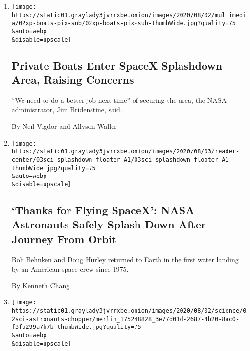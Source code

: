 \begin{enumerate}
\def\labelenumi{\arabic{enumi}.}
\item
  \href{/2020/08/02/us/flag-boat-SpaceX.html}{}

  \texttt{[image: https://static01.graylady3jvrrxbe.onion/images/2020/08/02/multimedia/02xp-boats-pix-sub/02xp-boats-pix-sub-thumbWide.jpg?quality=75\\\&auto=webp\\\&disable=upscale]}

  \hypertarget{private-boats-enter-spacex-splashdown-area-raising-concerns}{%
  \subsection{Private Boats Enter SpaceX Splashdown Area, Raising
  Concerns}\label{private-boats-enter-spacex-splashdown-area-raising-concerns}}

  ``We need to do a better job next time'' of securing the area, the
  NASA administrator, Jim Bridenstine, said.

  By Neil Vigdor and Allyson Waller
\item
  \href{/2020/08/02/science/spacex-astronauts-splashdown.html}{}

  \texttt{[image: https://static01.graylady3jvrrxbe.onion/images/2020/08/03/reader-center/03sci-splashdown-floater-A1/03sci-splashdown-floater-A1-thumbWide.jpg?quality=75\\\&auto=webp\\\&disable=upscale]}

  \hypertarget{thanks-for-flying-spacex-nasa-astronauts-safely-splash-down-after-journey-from-orbit}{%
  \subsection{`Thanks for Flying SpaceX': NASA Astronauts Safely Splash
  Down After Journey From
  Orbit}\label{thanks-for-flying-spacex-nasa-astronauts-safely-splash-down-after-journey-from-orbit}}

  Bob Behnken and Doug Hurley returned to Earth in the first water
  landing by an American space crew since 1975.

  By Kenneth Chang
\item
  \href{/2020/08/02/science/spacex-nasa-return.html}{}

  \texttt{[image: https://static01.graylady3jvrrxbe.onion/images/2020/08/02/science/02sci-astronauts-chopper/merlin\_175248828\_3e77d01d-2687-4b20-8ac0-f3fb299a7b7b-thumbWide.jpg?quality=75\\\&auto=webp\\\&disable=upscale]}

  \hypertarget{nasa-astronauts-in-spacex-capsule-make-first-water-landing-since-1975}{%
}
\end{enumerate}

